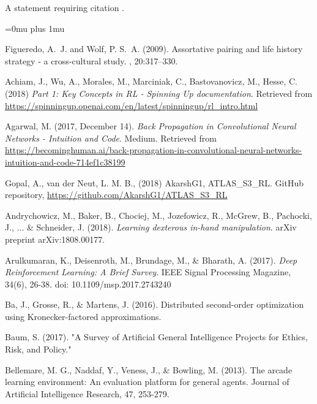 A statement requiring citation \cite{Figueredo:2009dg}.

\Urlmuskip=0mu plus 1mu\relax
\begin{thebibliography}{99} %

Figueredo, A.~J. and Wolf, P. S.~A. (2009).
\newblock Assortative pairing and life history strategy - a cross-cultural
  study.
, 20:317--330.

\bibitem{} Achiam, J., Wu, A., Morales, M., Marciniak, C., Bastovanovicz, M., Hesse, C. (2018) \textit{Part 1: Key Concepts in RL - Spinning Up documentation}. Retrieved from \url{https://spinningup.openai.com/en/latest/spinningup/rl\_intro.html}

\bibitem{} Agarwal, M. (2017, December 14). \textit{Back Propagation in Convolutional Neural Networks -
Intuition and Code}. Medium. Retrieved from \url{https://becominghuman.ai/back-propagation-in-convolutional-neural-networks-intuition-and-code-714ef1c38199}

\bibitem{} Gopal, A., van der Neut, L. M. B., (2018) AkarshG1, ATLAS\_S3\_RL. GitHub repository,
\url{https://github.com/AkarshG1/ATLAS\_S3\_RL}

\bibitem{} Andrychowicz, M., Baker, B., Chociej, M., Jozefowicz, R., McGrew, B., Pachocki, J., ... \& Schneider, J. (2018). \textit{Learning dexterous in-hand manipulation}. arXiv preprint arXiv:1808.00177.

\bibitem{} Arulkumaran, K., Deisenroth, M., Brundage, M., \& Bharath, A. (2017). \textit{Deep Reinforcement Learning: A Brief Survey}. IEEE Signal Processing Magazine, 34(6), 26-38. doi: 10.1109/msp.2017.2743240

\bibitem{} Ba, J., Grosse, R., \& Martens, J. (2016). Distributed second-order optimization using Kronecker-factored approximations.

\bibitem{} Baum, S. (2017). "A Survey of Artificial General Intelligence Projects for Ethics, Risk, and Policy." 

\bibitem{} Bellemare, M. G., Naddaf, Y., Veness, J., \& Bowling, M. (2013). The arcade learning
environment: An evaluation platform for general agents. Journal of Artificial Intelligence Research, 47, 253-279.


\end{thebibliography}
